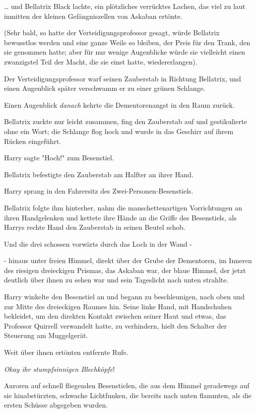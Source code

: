 {… und Bellatrix Black lachte, ein plötzliches verrücktes Lachen, das viel zu laut inmitten der kleinen Gefängniszellen von Askaban ertönte.

(Sehr bald, so hatte der Verteidigungsprofessor gesagt, würde Bellatrix bewusstlos werden und eine ganze Weile so bleiben, der Preis für den Trank, den sie genommen hatte; aber für nur wenige Augenblicke würde sie vielleicht einen zwanzigstel Teil der Macht, die sie einst hatte, wiedererlangen).

Der Verteidigungsprofessor warf seinen Zauberstab in Richtung Bellatrix, und einen Augenblick später verschwamm er zu einer grünen Schlange.

Einen Augenblick \emph{danach} kehrte die Dementorenangst in den Raum zurück.

Bellatrix zuckte nur leicht zusammen, fing den Zauberstab auf und gestikulierte ohne ein Wort; die Schlange flog hoch und wurde in das Geschirr auf ihrem Rücken eingeführt.

Harry sagte "Hoch!" zum Besenstiel.

Bellatrix befestigte den Zauberstab am Halfter an ihrer Hand.

Harry sprang in den Fahrersitz des Zwei-Personen-Besenstiels.

Bellatrix folgte ihm hinterher, nahm die manschettenartigen Vorrichtungen an ihren Handgelenken und kettete ihre Hände an die Griffe des Besenstiels, als Harrys rechte Hand den Zauberstab in seinen Beutel schob.

Und die drei schossen vorwärts durch das Loch in der Wand -

- hinaus unter freien Himmel, direkt über der Grube der Dementoren, im Inneren des riesigen dreieckigen Prismas, das Askaban war, der blaue Himmel, der jetzt deutlich über ihnen zu sehen war und sein Tageslicht nach unten strahlte.

Harry winkelte den Besenstiel an und begann zu beschleunigen, nach oben und zur Mitte des dreieckigen Raumes hin. Seine linke Hand, mit Handschuhen bekleidet, um den direkten Kontakt zwischen seiner Haut und etwas, das Professor Quirrell verwandelt hatte, zu verhindern, hielt den Schalter der Steuerung am Muggelgerät.

Weit über ihnen ertönten entfernte Rufe.

\emph{Okay ihr stumpfsinnigen Blechköpfe}!

Auroren auf schnell fliegenden Besenstielen, die aus dem Himmel geradewegs auf sie hinabstürzten, schwache Lichtfunken, die bereits nach unten flammten, als die ersten Schüsse abgegeben wurden.

}
